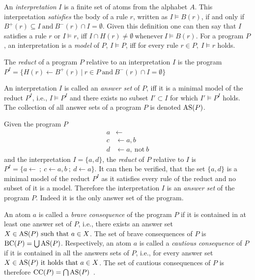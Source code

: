 An \emph{interpretation} $I$ is a finite set of atoms from the alphabet $A$. This interpretation \emph{satisfies} the body of a rule $r$, written as \(I \models B(r)\), if and only if \(B^+(r) \subseteq I\ \text{and}\ B^-(r) \cap I = \emptyset\). Given this definition one can then say that $I$ satisfies a rule $r$ or \(I \models r\), iff \(I \cap H(r) \neq \emptyset \ \text{whenever}\ I \models B(r)\). For a program $P$, an interpretation is a \emph{model} of $P$, \(I \models P\), iff for every rule \(r \in P,\ I \models r\) holds.
\begin{definition}
\label{def:reduct}
    The \emph{reduct} of a program $P$ relative to an interpretation $I$ is the program \(P^I = \{ H(r) \leftarrow B^+(r) \ | \ r \in P \ \text{and} \ B^-(r) \cap I = \emptyset\}\) \cite{GL88}
\end{definition}
An interpretation $I$ is called an \emph{answer set} of $P$, iff it is a minimal model of the reduct \(P^I\), i.e., \(I \models P^I \) and there exists no subset \( I' \subset I \) for which \( I' \models P^{I}\) holds. The collection of all answer sets of a program $P$ is denoted \(\operatorname{AS}(P)\).
\begin{example}
\label{ex:reduct}
    Given the program $P$
    \begin{align*}
        a &\leftarrow \\
        c &\leftarrow a, b \\
        d &\leftarrow a,\ \text{not}\ b
    \end{align*}
    and the interpretation \(I = \{a, d\}\), the \emph{reduct} of $P$ relative to $I$ is \(P^I = \{a \leftarrow\ ;\ c \leftarrow a, b\ ;\ d \leftarrow a\}\). It can then be verified, that the set \(\{a,d\}\) is a minimal model of the reduct \(P^I\) as it satisfies every rule of the reduct and no subset of it is a model. Therefore the interpretation $I$ is an \emph{answer set} of the program $P$. Indeed it is the only answer set of the program.
\end{example}
An atom $a$ is called a \emph{brave consequence} of the program $P$ if it is contained in at least one answer set of $P$, i.e., there exists an answer set \(X \in \operatorname{AS}(P) \ \text{such that}\ a \in X\). The set of brave consequences of $P$ is \(\text{BC}(P) = \bigcup \operatorname{AS}(P)\).
Respectively, an atom $a$ is called a \emph{cautious consequence} of $P$ if it is contained in all the answers sets of $P$, i.e., for every answer set \( X \in \AS(P) \ \text{it holds that}\ a \in X\). The set of cautious consequences of $P$ is therefore \(\text{CC}(P) = \bigcap \operatorname{AS}(P)\)~\cite{FGR22}.

